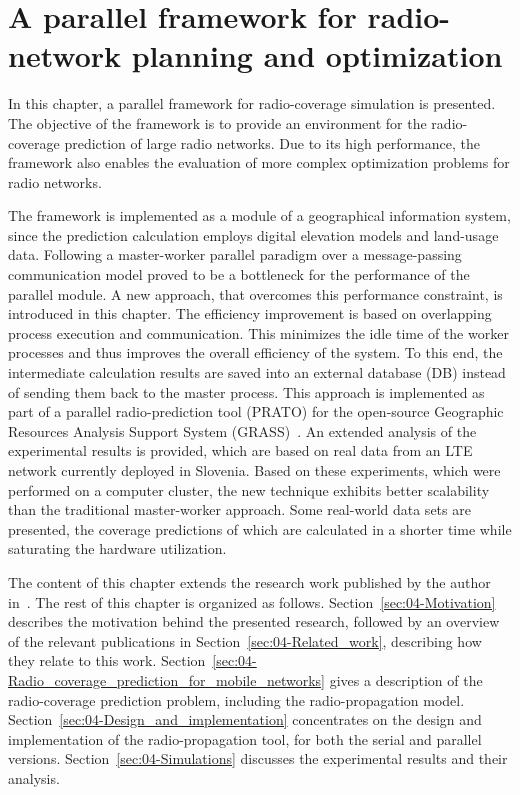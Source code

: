 
\chapter{A parallel framework for radio-network planning and optimization
\label{chap:04-Framework-design-and-implementation}}


In this chapter, a parallel framework for radio-coverage simulation
is presented. The objective of the framework is to provide an environment
for the radio-coverage prediction of large radio networks. Due to
its high performance, the framework also enables the evaluation of
more complex optimization problems for radio networks. 

The framework is implemented as a module of a geographical information
system, since the prediction calculation employs digital elevation
models and land-usage data. Following a master-worker parallel paradigm
over a message-passing communication model proved to be a bottleneck
for the performance of the parallel module. A new approach, that overcomes
this performance constraint, is introduced in this chapter. The efficiency
improvement is based on overlapping process execution and communication.
This minimizes the idle time of the worker processes and thus improves
the overall efficiency of the system. To this end, the intermediate
calculation results are saved into an external database (DB)
instead of sending them back to the master process. This approach
is implemented as part of a parallel radio-prediction tool (PRATO)
for the open-source Geographic Resources Analysis Support System (GRASS)~\cite{Neteler_Open_source_GIS_a_GRASS_GIS_approach}.
An extended analysis of the experimental results is provided, which
are based on real data from an LTE network currently deployed in Slovenia.
Based on these experiments, which were performed on a computer cluster,
the new technique exhibits better scalability than the traditional
master-worker approach. Some real-world data sets are presented, the
coverage predictions of which are calculated in a shorter time while
saturating the hardware utilization.

The content of this chapter extends the research work published by
the author in~\cite{Benedicic-A_GRASS_GIS_parallel_module_for_radio_propagation_predictions:2013}.
The rest of this chapter is organized as follows. Section~\ref{sec:04-Motivation}
describes the motivation behind the presented research, followed by
an overview of the relevant publications in Section~\ref{sec:04-Related_work},
describing how they relate to this work. Section~\ref{sec:04-Radio_coverage_prediction_for_mobile_networks}
gives a description of the radio-coverage prediction problem, including
the radio-propagation model. Section~\ref{sec:04-Design_and_implementation}
concentrates on the design and implementation of the radio-propagation
tool, for both the serial and parallel versions. Section~\ref{sec:04-Simulations}
discusses the experimental results and their analysis.


